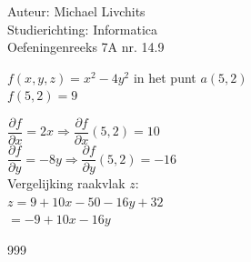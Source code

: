 \documentclass[a4paper]{article}
\begin{document}
  
\noindent \large Auteur: Michael Livchits \\
\noindent \large Studierichting: Informatica\\
\noindent \large Oefeningenreeks 7A nr. 14.9\\

\medskip

\normalsize

$f(x,y,z) = x^2-4y^2$ in het punt $a\left(5,2\right)$\\

$f(5,2) = 9$

$\dfrac{\partial f}{\partial x} = 2x \Rightarrow\dfrac{\partial f}{\partial x}(5,2) = 10$\\

$\dfrac{\partial f}{\partial y} = -8y \Rightarrow\dfrac{\partial f}{\partial y}(5,2) = -16$\\

Vergelijking raakvlak $z$:\\

$z = 9 + 10x - 50 - 16y + 32$\\

$= -9 + 10x -16y$\\

\begin{thebibliography}{999}
\end{thebibliography}
\end{document}
